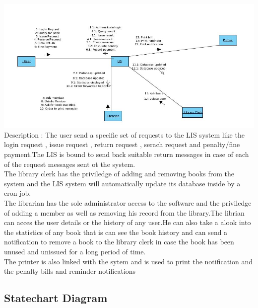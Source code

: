 \documentclass{article}
\begin{document}
\includegraphics[scale=0.50]{images/collaDiag.jpg}
\\
Description : The user send a specific set of requests to the LIS system like the login request , issue request , return request , serach request and penalty/fine payment.The LIS is bound to send back suitable return messages in case of each of the request messages sent ot the system.
\\
The library clerk has the priviledge of adding and removing books from the system and the LIS system will automatically update its database inside by a cron job.
\\
The librarian has the sole administrator access to the software and the priviledge of adding a member as well as removing his record from the library.The librian can acces the user details or the history of any user.He can also take a alook into the statistics of any book that is can see the book history and can send a notification to remove a book to the library clerk in case the book has been unused and unissued for a long period of time.
\\
The printer is also linked with the sytem and is used to print the notification and the penalty bills and reminder notifications

\subsection{Statechart Diagram}
\end{document}
